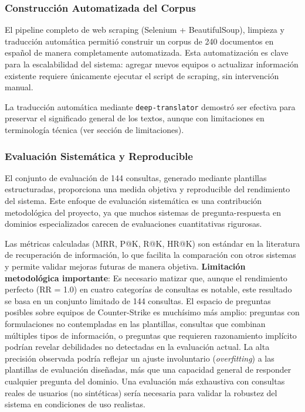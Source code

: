 \subsubsection{Construcción Automatizada del Corpus}

El pipeline completo de web scraping (Selenium + BeautifulSoup), limpieza y traducción automática permitió construir un corpus de 240 documentos en español de manera completamente automatizada. Esta automatización es clave para la escalabilidad del sistema: agregar nuevos equipos o actualizar información existente requiere únicamente ejecutar el script de scraping, sin intervención manual.

La traducción automática mediante \texttt{deep-translator} demostró ser efectiva para preservar el significado general de los textos, aunque con limitaciones en terminología técnica (ver sección de limitaciones).

\subsubsection{Evaluación Sistemática y Reproducible}

El conjunto de evaluación de 144 consultas, generado mediante plantillas estructuradas, proporciona una medida objetiva y reproducible del rendimiento del sistema. Este enfoque de evaluación sistemática es una contribución metodológica del proyecto, ya que muchos sistemas de pregunta-respuesta en dominios especializados carecen de evaluaciones cuantitativas rigurosas.

Las métricas calculadas (MRR, P@K, R@K, HR@K) son estándar en la literatura de recuperación de información, lo que facilita la comparación con otros sistemas y permite validar mejoras futuras de manera objetiva.
\textbf{Limitación metodológica importante}: Es necesario matizar que, aunque el rendimiento perfecto (RR = 1.0) en cuatro categorías de consultas es notable, este resultado se basa en un conjunto limitado de 144 consultas. El espacio de preguntas posibles sobre equipos de Counter-Strike es muchísimo más amplio: preguntas con formulaciones no contempladas en las plantillas, consultas que combinan múltiples tipos de información, o preguntas que requieren razonamiento implícito podrían revelar debilidades no detectadas en la evaluación actual. La alta precisión observada podría reflejar un ajuste involuntario (\textit{overfitting}) a las plantillas de evaluación diseñadas, más que una capacidad general de responder cualquier pregunta del dominio. Una evaluación más exhaustiva con consultas reales de usuarios (no sintéticas) sería necesaria para validar la robustez del sistema en condiciones de uso realistas.
